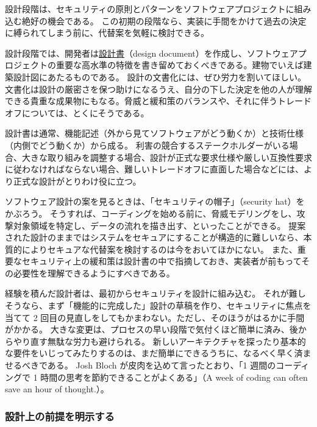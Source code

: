 \documentclass[uplatex]{jsarticle}
\def\label#1{}%
\begin{document}
設計段階は、セキュリティの原則とパターンをソフトウェアプロジェクトに組み込む絶好の機会である。
この初期の段階なら、実装に手間をかけて過去の決定に縛られてしまう前に、代替案を気軽に検討できる。

設計段階では、開発者は\underline{設計書}（design document）を作成し、ソフトウェアプロジェクトの重要な高水準の特徴を書き留めておくべきである。建物でいえば建築設計図にあたるものである。
設計の文書化には、ぜひ労力を割いてほしい。文書化は設計の厳密さを保つ助けになるうえ、自分の下した決定を他の人が理解できる貴重な成果物にもなる。脅威と緩和策のバランスや、それに伴うトレードオフについては、とくにそうである。

設計書は通常、機能記述（外から見てソフトウェアがどう動くか）と技術仕様（内側でどう動くか）から成る。
利害の競合するステークホルダーがいる場合、大きな取り組みを調整する場合、設計が正式な要求仕様や厳しい互換性要求に従わなければならない場合、難しいトレードオフに直面した場合などには、より正式な設計がとりわけ役に立つ。

ソフトウェア設計の案を見るときは、「セキュリティの帽子」（security hat）をかぶろう。
そうすれば、コーディングを始める前に、脅威モデリングをし、攻撃対象領域を特定し、データの流れを描き出す、といったことができる。
提案された設計のままではシステムをセキュアにすることが構造的に難しいなら、本質的によりセキュアな代替案を検討するのは今をおいてほかにない。
また、重要なセキュリティ上の緩和策は設計書の中で指摘しておき、実装者が前もってその必要性を理解できるようにすべきである。

経験を積んだ設計者は、最初からセキュリティを設計に組み込む。
それが難しそうなら、まず「機能的に完成した」設計の草稿を作り、セキュリティに焦点を当てて 2 回目の見直しをしてもかまわない。ただし、そのほうがはるかに手間がかかる。
大きな変更は、プロセスの早い段階で気付くほど簡単に済み、後からやり直す無駄な労力も避けられる。
新しいアーキテクチャを探ったり基本的な要件をいじってみたりするのは、まだ簡単にできるうちに、なるべく早く済ませるべきである。
Josh Bloch が皮肉を込めて言ったとおり、「1 週間のコーディングで 1 時間の思考を節約できることがよくある」（A week of coding can often save an hour of thought.）。

\subsubsection{設計上の前提を明示する}\label{subsec:ch6-explicit-assumptions}
\end{document}
